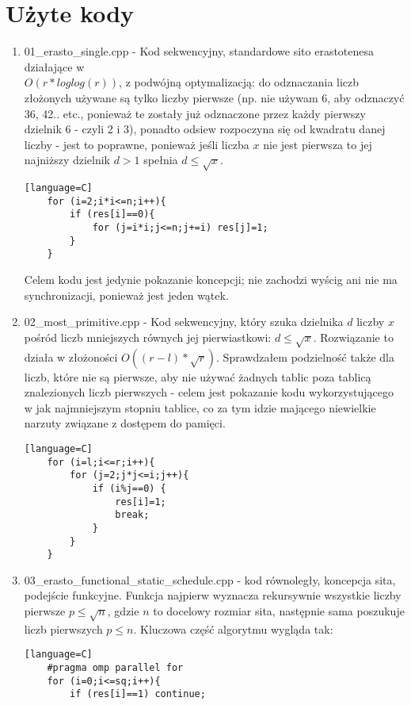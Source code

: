 \documentclass[12pt]{article}
\begin{document}
\section{Użyte kody}
\begin {enumerate}
	\item 01\_erasto\_single.cpp - Kod sekwencyjny, standardowe sito erastotenesa działające w\\ \(O(r*loglog(r))\), z podwójną optymalizacją: do odznaczania liczb złożonych używane są tylko liczby pierwsze (np. nie używam 6, aby odznaczyć 36, 42.. etc., ponieważ te zostały już odznaczone przez każdy pierwszy dzielnik 6 - czyli 2 i 3), ponadto odsiew rozpoczyna się od kwadratu danej liczby - jest to poprawne, ponieważ jeśli liczba \(x\) nie jest pierwsza to jej najniższy dzielnik \(d>1\) spełnia \(d\le \sqrt{x}\).
	\begin{lstlisting}[style=mystyle, caption= Sito Erastotenesa][language=C]
	for (i=2;i*i<=n;i++){
		if (res[i]==0){
			for (j=i*i;j<=n;j+=i) res[j]=1;
		}
	}
	\end{lstlisting}
	Celem kodu jest jedynie pokazanie koncepcji; nie zachodzi wyścig ani nie ma synchronizacji, ponieważ jest jeden wątek.
	\item 02\_most\_primitive.cpp - Kod sekwencyjny, który szuka dzielnika \(d\) liczby \(x\) pośród liczb mniejszych równych jej pierwiastkowi: \(d \le \sqrt{x}\). Rozwiązanie to działa w złożoności \(O((r-l)*\sqrt{r})\). Sprawdzałem podzielność także dla liczb, które nie są pierwsze, aby nie używać żadnych tablic poza tablicą znalezionych liczb pierwszych - celem jest pokazanie kodu wykorzystującego w jak najmniejszym stopniu tablice, co za tym idzie mającego niewielkie narzuty związane z dostępem do pamięci.
	\begin{lstlisting}[style=mystyle, caption= Rozwiązanie pierwiastkowe][language=C]
	for (i=l;i<=r;i++){
		for (j=2;j*j<=i;j++){
			if (i%j==0) {
				res[i]=1;
				break;
			}
		}
	}
	\end{lstlisting}
	\item 03\_erasto\_functional\_static\_schedule.cpp - kod równoległy, koncepcja sita, podejście funkcyjne. Funkcja najpierw wyznacza rekursywnie wszystkie liczby pierwsze \(p\le \sqrt{n}\), gdzie \(n\) to docelowy rozmiar sita, następnie sama poszukuje liczb pierwszych \(p\le n\). Kluczowa część algorytmu wygląda tak:
	\begin{lstlisting}[style=mystyle, caption= Sito funkcyjne ze static schedulingiem][language=C]
	#pragma omp parallel for
	for (i=0;i<=sq;i++){
		if (res[i]==1) continue;

\end{lstlisting}
\end{enumerate}
\end{document}
